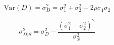 \[ \mbox{Var}(D) = \sigma^2_D = \sigma^2_1 + \sigma^2_2 - 2\rho\sigma_1\sigma_2 \]

\[ \sigma^2_{D|S} = \sigma^2_D  - \frac{(\sigma^2_1 - \sigma^2_2)^2}{\sigma^2_S} \]
